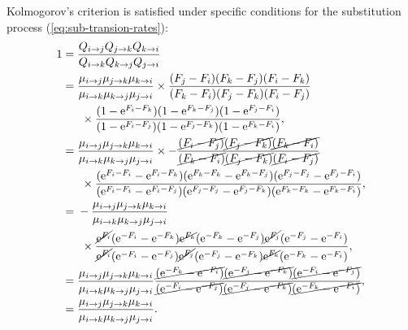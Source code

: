Kolmogorov's criterion is satisfied under specific conditions for the \gls{substitution} process (\ref{eq:sub-transion-rates}):
\begin{align}
    1 ={}& \dfrac{Q_{{i} \to {j}}Q_{{j} \to {k}}Q_{{k} \to {i}}}{Q_{{i} \to {k}}Q_{{k} \to {j}}Q_{{j} \to {i}}}\\
    ={}& \dfrac{\mu_{{i} \to {j}}\mu_{{j} \to {k}}\mu_{{k} \to {i}}}{\mu_{{i} \to {k}}\mu_{{k} \to {j}}\mu_{{j} \to {i}}} \times \dfrac{(F_{{j}} - F_{{i}})(F_{{k}} - F_{{j}})(F_{{i}} - F_{{k}})}{(F_{{k}} - F_{{i}})(F_{{j}} - F_{{k}})(F_{{i}} - F_{{j}})} \notag \\
    &\ \times \dfrac{( 1 - \text{e}^{F_{{i}} - F_{{k}}} )( 1 - \text{e}^{F_{{k}} - F_{{j}}} )( 1 - \text{e}^{F_{{j}} - F_{{i}}} )}{( 1 - \text{e}^{F_{{i}} - F_{{j}}} )( 1 - \text{e}^{F_{{j}} - F_{{k}}} )( 1 - \text{e}^{F_{{k}} - F_{{i}}} )}, \\
    ={}& \dfrac{\mu_{{i} \to {j}}\mu_{{j} \to {k}}\mu_{{k} \to {i}}}{\mu_{{i} \to {k}}\mu_{{k} \to {j}}\mu_{{j} \to {i}}} \times -\dfrac{\cancel{(F_{{i}} - F_{{j}})}\cancel{(F_{{j}} - F_{{k}})}\cancel{(F_{{k}} - F_{{i}})}}{\cancel{(F_{{k}} - F_{{i}})}\cancel{(F_{{j}} - F_{{k}})}\cancel{(F_{{i}} - F_{{j}})}} \notag \\
    &\ \times \dfrac{( \text{e}^{F_{{i}} - F_{{i}}} - \text{e}^{F_{{i}} - F_{{k}}} )( \text{e}^{F_{{k}} - F_{{k}}} - \text{e}^{F_{{k}} - F_{{j}}} )( \text{e}^{F_{{j}} - F_{{j}}} - \text{e}^{F_{{j}} - F_{{i}}} )}{( \text{e}^{F_{{i}} - F_{{i}}} - \text{e}^{F_{{i}} - F_{{j}}} )( \text{e}^{F_{{j}} - F_{{j}}} - \text{e}^{F_{{j}} - F_{{k}}} )( \text{e}^{F_{{k}} - F_{{k}}} - \text{e}^{F_{{k}} - F_{{i}}} )}, \\
    ={}& - \dfrac{\mu_{{i} \to {j}}\mu_{{j} \to {k}}\mu_{{k} \to {i}}}{\mu_{{i} \to {k}}\mu_{{k} \to {j}}\mu_{{j} \to {i}}} \notag \\
    &\ \times \dfrac{\cancel{\text{e}^{F_{{i}}}}( \text{e}^{-F_{{i}}} - \text{e}^{ - F_{{k}}} )\cancel{\text{e}^{F_{{k}}}}( \text{e}^{-F_{{k}}} - \text{e}^{ - F_{{j}}} )\cancel{\text{e}^{F_{{j}}}}( \text{e}^{-F_{{j}}} - \text{e}^{ - F_{{i}}} )}{\cancel{\text{e}^{F_{{i}}}}( \text{e}^{-F_{{i}}} - \text{e}^{ - F_{{j}}} )\cancel{\text{e}^{F_{{j}}}}( \text{e}^{-F_{{j}}} - \text{e}^{ - F_{{k}}} )\cancel{\text{e}^{F_{{k}}}}( \text{e}^{-F_{{k}}} - \text{e}^{ - F_{{i}}} )}, \\
    ={}& \dfrac{\mu_{{i} \to {j}}\mu_{{j} \to {k}}\mu_{{k} \to {i}}}{\mu_{{i} \to {k}}\mu_{{k} \to {j}}\mu_{{j} \to {i}}} \dfrac{\cancel{( \text{e}^{-F_{{k}}} - \text{e}^{ - F_{{i}}} )}\cancel{( \text{e}^{-F_{{j}}} - \text{e}^{ - F_{{k}}} )}\cancel{( \text{e}^{-F_{{i}}} - \text{e}^{ - F_{{j}}} )}}{\cancel{( \text{e}^{-F_{{i}}} - \text{e}^{ - F_{{j}}} )}\cancel{( \text{e}^{-F_{{j}}} - \text{e}^{ - F_{{k}}} )}\cancel{( \text{e}^{-F_{{k}}} - \text{e}^{ - F_{{i}}} )}}, \\
    ={}& \dfrac{\mu_{{i} \to {j}}\mu_{{j} \to {k}}\mu_{{k} \to {i}}}{\mu_{{i} \to {k}}\mu_{{k} \to {j}}\mu_{{j} \to {i}}}.
\end{align}
